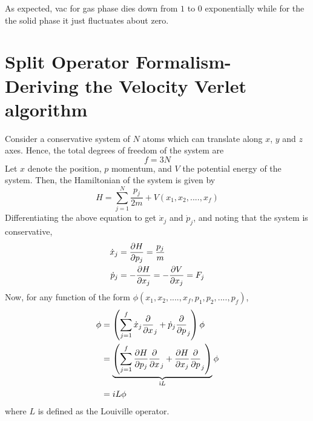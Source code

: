 \documentclass[11pt, oneside]{article}   	%
\begin{document}
As expected, vac for gas phase dies down from $1$ to $0$ exponentially while for the the solid phase it just fluctuates about zero.
\pagebreak
\section{Split Operator Formalism- Deriving the Velocity Verlet algorithm}
Consider a conservative system of $N$ atoms which can translate along $x$, $y$ and $z$ axes. Hence, the total degrees of freedom of the system are
	\begin{equation}
	f = 3N
	\end{equation}
Let $x$ denote the position, $p$ momentum, and $V$ the potential energy of the system. Then, the Hamiltonian of the system is given by
	\begin{equation}
	H = \sum \limits_{j=1}^N \frac{p_j}{2m} + V(x_1, x_2, ...., x_f)
	\end{equation}
Differentiating the above equation to get $\dot{x}_j$ and $\dot{p}_j$, and noting that the system is conservative,
	\begin{align}
	\dot{x}_j &= \pdv{H}{p_j} = \frac{p_j}{m} \\
	\dot{p}_j &= -\pdv{H}{x_j} = -\pdv{V}{x_j} = F_j
	\end{align}
Now, for any function of the form $\phi(x_1, x_2, ...., x_f, p_1, p_2, ...., p_f)$,
	\begin{align}
	\phi &= \left(\sum \limits_{j=1}^f \dot{x}_j \pdv{}{x}_j + \dot{p}_j \pdv{}{p}_j \right) \phi \\
		&= \underbrace{\left(\sum \limits_{j=1}^f \pdv{H}{p_j} \pdv{}{x}_j + \pdv{H}{x_j} \pdv{}{p}_j \right)}_{\text iL} \phi \\
		&= iL \phi
	\end{align}
where $L$ is defined as the Louiville operator.
\end{document}
